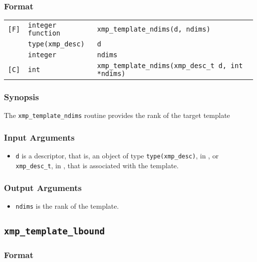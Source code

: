 \subsubsection*{Format}

\begin{tabular}{lll}

\verb![F]!& {\tt integer function}& {\tt xmp\_template\_ndims(d, ndims)}\\
          & {\tt type(xmp\_desc)} & {\tt d}\\
          & {\tt integer} & {\tt ndims}\\

\verb![C]!&  {\tt int}& {\tt xmp\_template\_ndims(xmp\_desc\_t d, int *ndims)}\\

\end{tabular}

\subsubsection*{Synopsis}

The {\tt xmp\_template\_ndims} routine provides the rank of the target template


\subsubsection*{Input Arguments}
\begin{itemize}
 \item {\tt d} is a descriptor, that is, an object of type 
       {\tt type(xmp\_desc)}, in {\XMPF}, or {\tt xmp\_desc\_t},
       in {\XMPC}, that is associated with the template.
\end{itemize}

\subsubsection*{Output Arguments}
\begin{itemize}
 \item {\tt ndims} is the rank of the template.
\end{itemize}


\subsection{\tt xmp\_template\_lbound}

\subsubsection*{Format}

